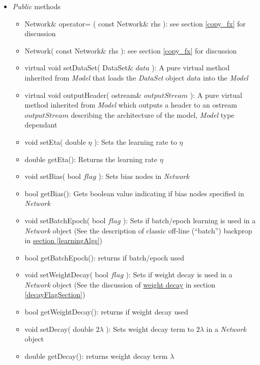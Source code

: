 \documentclass{report}
\def\beginred{\color{red}}
\def\endcolor{\color{black}}
\begin{document}
\begin{itemize}

\item {\em Public} methods

\begin{itemize}
\item Network\& operator= ( const Network\& rhs ): see section
      \ref{copy_fx} for discussion
\item Network( const Network\& rhs ): see section \ref{copy_fx} for
      discussion
\item \beginred virtual void setDataSet( DataSet\& $data$ ): A pure
      virtual method inherited from {\em Model} that loads the {\em
      DataSet} object $data$ into the {\em Model} \endcolor
\item \beginred virtual void outputHeader( ostream\& $outputStream$ ):
      A pure virtual method inherited from {\em Model} which outputs a
      header to an ostream $outputStream$ describing the architecture
      of the model, {\em Model} type dependant \endcolor
\item void setEta( double $\eta$ ): Sets the learning rate to $\eta$
\item double getEta(): Returns the learning rate $\eta$
\item void setBias( bool $flag$ ): Sets bias nodes in {\em Network}
\item bool getBias(): Gets boolean value indicating if bias nodes
      specified in {\em Network}
\item void setBatchEpoch( bool $flag$ ): Sets if batch/epoch learning
      is used in a {\em Network} object (See the description of
      classic off-line (``batch'') backprop in
      \hyperref[learningAlgs]{section \ref{learningAlgs}})
\item bool getBatchEpoch(): returns if batch/epoch used
\item void setWeightDecay( bool $flag$ ): Sets if weight decay is used
      in a {\em Network} object (See the discussion of
      \hyperref[discussDecay]{weight decay} in section
      \ref{decayFlagSection})
\item bool getWeightDecay(): returns if weight decay used
\item void setDecay( double $2\lambda$ ): Sets weight decay term to
      $2\lambda$ in a {\em Network} object
\item double getDecay(): returns weight decay term $\lambda$

\end{itemize}
\end{itemize}
\end{document}
